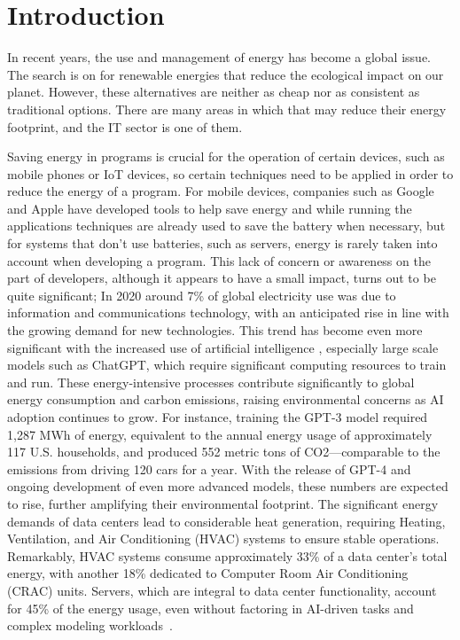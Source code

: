 \chapter{Introduction}

In recent years, the use and management of energy has become a global issue. The search is on for renewable energies that reduce the ecological impact on our planet. However, these alternatives are neither as cheap nor as consistent as traditional options. There are many areas in which that may reduce their energy footprint, and the IT sector is one of them.

Saving energy in programs is crucial for the operation of certain devices, such as mobile phones or IoT devices, so certain techniques need to be applied in order to reduce the energy of a program. For mobile devices, companies such as Google and Apple have developed tools\cite{google_adaptive_battery,google_battery_saver,apple_clean_energy, android_power_profiler} to help save energy and while running the applications techniques are already used to save the battery when necessary, but for systems that don't use batteries, such as servers, energy is rarely taken into account when developing a program. This lack of concern or awareness on the part of developers, although it appears to have a small impact, turns out to be quite significant; In 2020 around 7\% of global electricity use was due to information and communications technology, with an anticipated rise in line with the growing demand for new technologies\cite{article}. This trend has become even more significant with the increased use of artificial intelligence \cite{patterson2021carbon}, especially large scale models such as ChatGPT, which require significant computing resources to train and run. These energy-intensive processes contribute significantly to global energy consumption and carbon emissions, raising environmental concerns as AI adoption continues to grow. For instance, training the GPT-3 model required 1,287 MWh of energy, equivalent to the annual energy usage of approximately 117 U.S. households, and produced 552 metric tons of CO2—comparable to the emissions from driving 120 cars for a year. With the release of GPT-4 and ongoing development of even more advanced models, these numbers are expected to rise, further amplifying their environmental footprint. The significant energy demands of data centers lead to considerable heat generation, requiring Heating, Ventilation, and Air Conditioning (HVAC) systems to ensure stable operations. Remarkably, HVAC systems consume approximately 33\% of a data center's total energy, with another 18\% dedicated to Computer Room Air Conditioning (CRAC) units. Servers, which are integral to data center functionality, account for 45\% of the energy usage, even without factoring in AI-driven tasks and complex modeling workloads~\cite{balaras2017high}.

